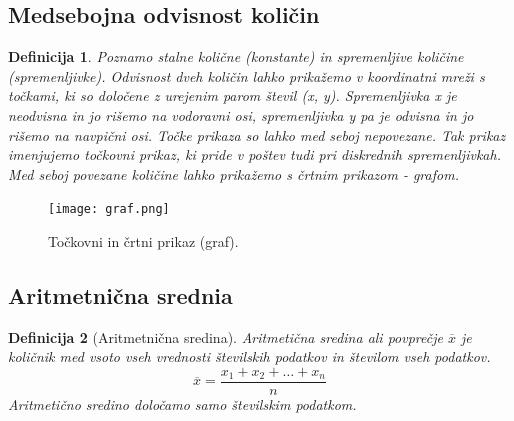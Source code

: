 \documentclass{article}
\newtheorem{definicija}{Definicija}[subsection]
\begin{document}
\pagebreak
\subsection{Medsebojna odvisnost količin}

\begin{definicija}
    Poznamo stalne količne (konstante) in spremenljive količine (spremenljivke). Odvisnost dveh količin lahko prikažemo v koordinatni mreži s točkami, ki so določene z urejenim parom števil (x, y). Spremenljivka x je neodvisna in jo rišemo na vodoravni osi, spremenljivka y pa je odvisna in jo rišemo na navpični osi. Točke prikaza so lahko med seboj nepovezane. Tak prikaz imenjujemo točkovni prikaz, ki pride v poštev tudi pri diskrednih spremenljivkah. Med seboj povezane količine lahko prikažemo s črtnim prikazom - grafom.
\end{definicija}


\begin{figure}[h]
    \texttt{[image: graf.png]}
    \centering
    \caption{Točkovni in črtni prikaz (graf).}
\end{figure}


\pagebreak
\subsection{Aritmetnična srednia}

\begin{definicija}[Aritmetnična sredina]
    Aritmetična sredina ali povprečje $\overline{x}$ je količnik med vsoto vseh vrednosti številskih podatkov in številom vseh podatkov.
    \[
        \overline{x} = \frac{x_1 + x_2 + \dots + x_n}{n}    
    \]
    Aritmetično sredino določamo samo številskim podatkom.
\end{definicija}
\end{document}
